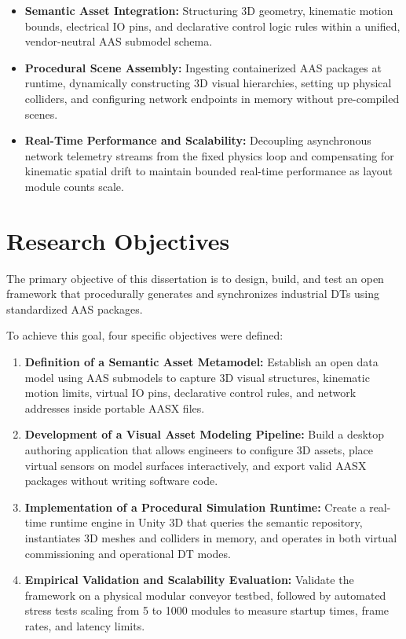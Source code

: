 \begin{itemize}
    \item \textbf{Semantic Asset Integration:} Structuring 3D geometry, kinematic motion bounds, electrical \gls{IO} pins, and declarative control logic rules within a unified, vendor-neutral \gls{AAS} submodel schema.

    \item \textbf{Procedural Scene Assembly:} Ingesting containerized \gls{AAS} packages at runtime, dynamically constructing 3D visual hierarchies, setting up physical colliders, and configuring network endpoints in memory without pre-compiled scenes.

    \item \textbf{Real-Time Performance and Scalability:} Decoupling asynchronous network telemetry streams from the fixed physics loop and compensating for kinematic spatial drift to maintain bounded real-time performance as layout module counts scale.
\end{itemize}

\section{Research Objectives}
\label{sec:objectives}

The primary objective of this dissertation is to design, build, and test an open framework that procedurally generates and synchronizes industrial \glspl{DT} using standardized \gls{AAS} packages.

To achieve this goal, four specific objectives were defined:

\begin{enumerate}
    \item \textbf{Definition of a Semantic Asset Metamodel:} Establish an open data model using \gls{AAS} submodels to capture 3D visual structures, kinematic motion limits, virtual \gls{IO} pins, declarative control rules, and network addresses inside portable \gls{AASX} files.

    \item \textbf{Development of a Visual Asset Modeling Pipeline:} Build a desktop authoring application that allows engineers to configure 3D assets, place virtual sensors on model surfaces interactively, and export valid \gls{AASX} packages without writing software code.

    \item \textbf{Implementation of a Procedural Simulation Runtime:} Create a real-time runtime engine in Unity 3D that queries the semantic repository, instantiates 3D meshes and colliders in memory, and operates in both virtual commissioning and operational \gls{DT} modes.

    \item \textbf{Empirical Validation and Scalability Evaluation:} Validate the framework on a physical modular conveyor testbed, followed by automated stress tests scaling from 5 to 1000 modules to measure startup times, frame rates, and latency limits.
\end{enumerate}

